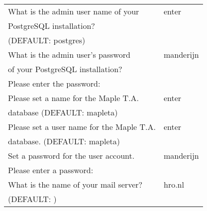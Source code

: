 \begin{enumerate}
\begin{tabular}{ | l | l |}
				\hline
				 What is the admin user name of your & enter\\
				 PostgreSQL installation?    & \\
				 (DEFAULT: postgres)& \\
				\hline
				 What is the admin user's password & manderijn\\
				 of your PostgreSQL installation? & \\
				 Please enter the password: & \\
				 \hline
				 Please set a name for the Maple T.A. & enter\\
				 database \quad (DEFAULT: mapleta) & \\
				 \hline
				 Please set a user name for the Maple T.A. & enter\\
				 database. (DEFAULT: mapleta) & \\
				 \hline
				 Set a password for the user account. & manderijn\\
				 Please enter a password: & \\
				 \hline
				 What is the name of your mail server?  & hro.nl\\
				 (DEFAULT: ) & \\
				 \hline
		\end{tabular}
	

\end{enumerate}
